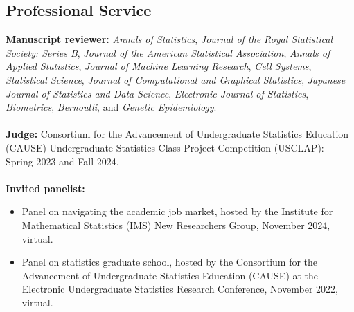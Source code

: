 \documentclass[margin, 10pt]{res}
\begin{document}
\begin{resume}
\section{Professional Service}
\textbf{Manuscript reviewer:} \textit{Annals of Statistics}, \textit{Journal of the Royal Statistical Society: Series B}, \textit{Journal of the American Statistical Association}, \textit{Annals of Applied Statistics}, \textit{Journal of Machine Learning Research}, \textit{Cell Systems}, \textit{Statistical Science}, \textit{Journal of Computational and Graphical Statistics}, \textit{Japanese Journal of Statistics and Data Science}, \textit{Electronic Journal of Statistics}, \textit{Biometrics}, \textit{Bernoulli}, and \textit{Genetic Epidemiology}. \\
\\
\textbf{Judge:} Consortium for the Advancement of Undergraduate Statistics Education (CAUSE) Undergraduate Statistics Class Project Competition (USCLAP): Spring 2023 and Fall 2024.\\
\\
\textbf{Invited panelist:}
\begin{itemize}
\item Panel on navigating the academic job market, hosted by the Institute for Mathematical Statistics (IMS) New Researchers Group, November 2024, virtual. 
\item Panel on statistics graduate school, hosted by the Consortium for the Advancement of Undergraduate Statistics Education (CAUSE) at the  Electronic Undergraduate Statistics Research Conference, November 2022, virtual.
\end{itemize}




\end{resume}
\end{document}
